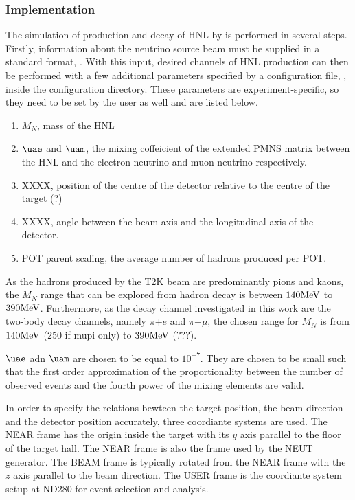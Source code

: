     \subsubsection{Implementation}
        The simulation of production and decay of HNL by  is performed in several steps.
        Firstly, information about the neutrino source beam must be supplied in a standard format, .
        With this input, desired channels of HNL production can then be performed with a few additional parameters specified by a configuration  file, , inside the  configuration directory. 
        These parameters are experiment-specific, so they need to be set by the user as well and are listed below.
        \begin{enumerate}
            \item $M_{N}$, mass of the HNL
            \item $\uae$ and $\uam$, the mixing coffeicient of the extended PMNS matrix between the HNL and the electron neutrino and muon neutrino respectively.
            \item XXXX, position of the centre of the detector relative to the centre of the target (?)
            \item XXXX, angle between the beam axis and the longitudinal axis of the detector.
            \item POT parent scaling, the average number of hadrons produced per POT.
        \end{enumerate}
        As the hadrons produced by the T2K beam are predominantly pions and kaons, the $M_{N}$ range that can be explored from hadron decay is between $140\textrm{MeV}$ to $390\textrm{MeV}$. 
        Furthermore, as the decay channel investigated in this work are the two-body decay channels, namely $\pi$+$e$ and $\pi$+$\mu$, the chosen range for $M_{N}$ is from $140\textrm{MeV}$ (250 if mupi only) to $390\textrm{MeV}$ (???).
        
        $\uae$ adn $\uam$ are chosen to be equal to $10^{-7}$. They are chosen to be small such that the first order approximation of the proportionality between the number of observed events and the fourth power of the mixing elements are valid.

        In order to specify the relations bewteen the target position, the beam direction and the detector position accurately, three coordiante systems are used.
        The NEAR frame has the origin inside the target with its $y$ axis parallel to the floor of the target hall.
        The NEAR frame is also the frame used by the NEUT generator.
        The BEAM frame is typically rotated from the NEAR frame with the $z$ axis parallel to the beam direction. 
        The USER frame is the coordiante system setup at ND280 for event selection and analysis.

